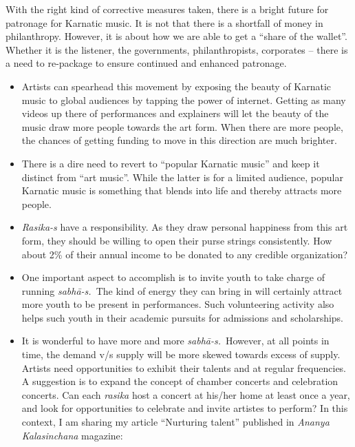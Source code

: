 With the right kind of corrective measures taken, there is a bright future for patronage for Karnatic music. It is not that there is a shortfall of money in philanthropy. However, it is about how we are able to get a “share of the wallet”. Whether it is the listener, the governments, philanthropists, corporates – there is a need to re-package to ensure continued and enhanced patronage.

\begin{itemize}
\itemsep=0pt

 \item Artists can spearhead this movement by exposing the beauty of Karnatic music to global audiences by tapping the power of internet. Getting as many videos up there of performances and explainers will let the beauty of the music draw more people towards the art form. When there are more people, the chances of getting funding to move in this direction are much brighter.

 \item There is a dire need to revert to “popular Karnatic music” and keep it distinct from “art music”. While the latter is for a limited audience, popular Karnatic music is something that blends into life and thereby attracts more people.

 \item \textit{Rasika-s} have a responsibility. As they draw personal happiness from this art form, they should be willing to open their purse strings consistently. How about 2\% of their annual income to be donated to any credible organization?

 \item One important aspect to accomplish is to invite youth to take charge of running \textit{sabhā-s.}~The kind of energy they can bring in will certainly attract more youth to be present in performances. Such volunteering activity also helps such youth in their academic pursuits for admissions and scholarships.

 \item 
 It is wonderful to have more and more \textit{sabhā-s.}~However, at all points in time, the demand v/s supply will be more skewed towards excess of supply. Artists need opportunities to exhibit their talents and at regular frequencies. A suggestion is to expand the concept of chamber concerts and celebration concerts. Can each \textit{rasika} host a concert at his/her home at least once a year, and look for opportunities to celebrate and invite artistes to perform? In this context, I am sharing my article “Nurturing talent” published in \textit{Ananya Kalasinchana} magazine:


\end{itemize}

